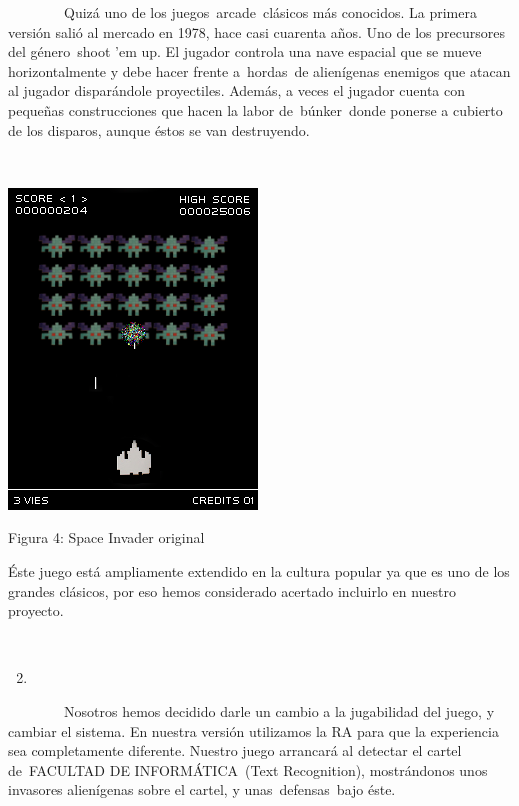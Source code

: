 \documentclass[]{article}
\begin{document}
~~~~~~~~Quizá uno de los juegos~arcade~clásicos más conocidos. La
primera versión salió al mercado en 1978, hace casi cuarenta años. Uno
de los precursores del género~shoot 'em up. El jugador controla una nave
espacial que se mueve horizontalmente y debe hacer frente a~hordas~de
alienígenas enemigos que atacan al jugador disparándole proyectiles.
Además, a veces el jugador cuenta con pequeñas construcciones que hacen
la labor de~búnker~donde ponerse a cubierto de los disparos, aunque
éstos se van destruyendo.

~~~~~~~~~~~~~~~~~ ~~~~~~~~~~~~~~~~~

\includegraphics{images/image12.png}

Figura 4: Space Invader original

Éste juego está ampliamente extendido en la cultura popular ya que es
uno de los grandes clásicos, por eso hemos considerado acertado
incluirlo en nuestro proyecto.

~~~~~~~~

\begin{enumerate}
\setcounter{enumi}{1}
\item
\end{enumerate}

~~~~~~~~Nosotros hemos decidido darle un cambio a la jugabilidad del
juego, y cambiar el sistema. En nuestra versión utilizamos la RA para
que la experiencia sea completamente diferente. Nuestro juego arrancará
al detectar el cartel de~FACULTAD DE INFORMÁTICA~(Text Recognition),
mostrándonos unos invasores alienígenas sobre el cartel, y
unas~defensas~bajo éste.
\end{document}
